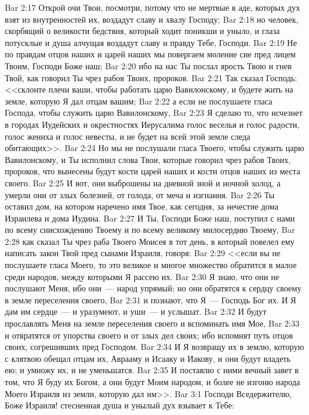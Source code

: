 \vs Bar 2:17 Открой очи Твои, посмотри, потому что не мертвые в аде, которых дух взят из внутренностей их, воздадут славу и хвалу Господу;
\vs Bar 2:18 но человек, скорбящий о великости бедствия, который ходит поникши и уныло, и глаза потусклые и душа алчущая воздадут славу и правду Тебе, Господи.
\vs Bar 2:19 Не по правдам отцов наших и царей наших мы повергаем моление сие пред лицем Твоим, Господи Боже наш;
\vs Bar 2:20 ибо на нас Ты послал ярость Твою и гнев Твой, как говорил Ты чрез рабов Твоих, пророков.
\vs Bar 2:21 Так сказал Господь: <<склонте плечи ваши, чтобы работать царю Вавилонскому, и будете жить на земле, которую Я дал отцам вашим;
\vs Bar 2:22 а если не послушаете гласа Господа, чтобы служить царю Вавилонскому,
\vs Bar 2:23 Я сделаю то, что исчезнет в городах Иудейских и окрестностях Иерусалима голос веселья и голос радости, голос жениха и голос невесты, и не будет на всей этой земле следа обитающих>>.
\vs Bar 2:24 Но мы не послушали гласа Твоего, чтобы служить царю Вавилонскому, и Ты исполнил слова Твои, которые говорил чрез рабов Твоих, пророков, что вынесены будут кости царей наших и кости отцов наших из места своего.
\vs Bar 2:25 И вот, они выброшены на дневной зной и ночной холод, а умерли они от злых болезней, от голода, от меча и изгнания.
\vs Bar 2:26 Ты оставил дом, на котором наречено имя Твое, как сегодня, за нечестие дома Израилева и дома Иудина.
\vs Bar 2:27 И Ты, Господи Боже наш, поступил с нами по всему снисхождению Твоему и по всему великому милосердию Твоему,
\vs Bar 2:28 как сказал Ты чрез раба Твоего Моисея в тот день, в который повелел ему написать закон Твой пред сынами Израиля, говоря:
\vs Bar 2:29 <<если вы не послушаете гласа Моего, то это великое и многое множество  обратится в малое среди народов, между которыми Я рассею их.
\vs Bar 2:30 Я знаю, что они не послушают Меня, ибо они~--- народ упрямый; но они обратятся к сердцу своему в земле переселения своего,
\vs Bar 2:31 и познают, что Я~--- Господь Бог их. И Я дам им сердце~--- и уразумеют, и уши~--- и услышат.
\vs Bar 2:32 И будут прославлять Меня на земле переселения своего и вспоминать имя Мое,
\vs Bar 2:33 и отвратятся от упорства своего и от злых дел своих; ибо вспомнят путь отцов своих, согрешивших пред Господом.
\vs Bar 2:34 И Я возвращу их в землю, которую с клятвою обещал отцам их, Аврааму и Исааку и Иакову, и они будут владеть ею; и умножу их, и не уменьшатся.
\vs Bar 2:35 И поставлю с ними вечный завет в том, что Я буду их Богом, а они будут Моим народом, и более не изгоню народа Моего Израиля из земли, которую дал им>>.
\vs Bar 3:1 Господи Вседержителю, Боже Израиля! стесненная душа и унылый дух взывает к Тебе:

